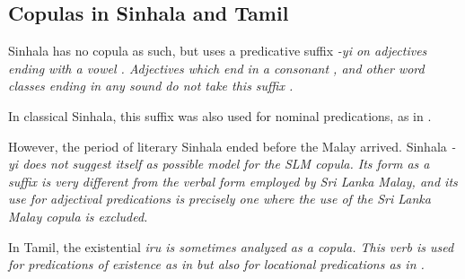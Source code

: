 \documentclass[a4paper,12pt]{article}
\begin{document}
\subsection{Copulas in Sinhala and Tamil}
Sinhala has no copula as such, but uses a predicative suffix \em -yi \em on adjectives ending with a vowel . Adjectives which end in a consonant  , and other word classes ending in any sound do not take this suffix .







In classical Sinhala, this suffix was also used for nominal predications, as in .



However, the period of literary Sinhala ended before the Malay arrived.   Sinhala \em -yi \em does not suggest itself as possible model for the SLM copula. Its form as a suffix is very different from the verbal form employed by Sri Lanka Malay, and its use for adjectival predications is precisely one where the use of the Sri Lanka Malay copula is excluded.

In Tamil, the existential \em iru \em is sometimes analyzed as a copula. This verb is used for predications of existence as in  but also for locational predications as in .
\end{document}
